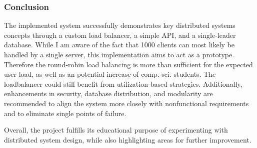 \documentclass{article}
\begin{document}
\subsubsection{Conclusion}
The implemented system successfully demonstrates key distributed systems concepts through a custom load balancer, a simple API, and a single-leader database. While I am aware of the fact that 1000 clients can most likely be handled by a single server, this implementation aims to act as a prototype.
Therefore the round-robin load balancing is more than sufficient for the expected user load, as well as an potential increase of comp.-sci. students.
The loadbalancer could still benefit from utilization-based strategies. Additionally, enhancements in security, database distribution, and modularity are recommended to align the system more closely with nonfunctional requirements and to eliminate single points of failure. 

Overall, the project fulfills its educational purpose of experimenting with distributed system design, while also highlighting areas for further improvement.

\printbibliography[heading=bibintoc]
\end{document}
